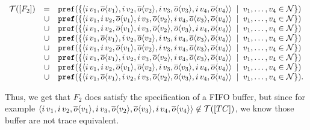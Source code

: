 \begin{align*}
	\begin{array}{rcl}
		\traces[F_2]&=&\pref{\set[v_1,\ldots{},v_4\in\names]{\seq{\inpa{i}{v_1},\outa{o}{v_1},\inpa{i}{v_2},\outa{o}{v_2},\inpa{i}{v_3},\outa{o}{v_3},\inpa{i}{v_4},\outa{o}{v_4}}}} \\
&\cup&\pref{\set[v_1,\ldots{},v_4\in\names]{\seq{\inpa{i}{v_1},\inpa{i}{v_2},\outa{o}{v_1},\inpa{i}{v_3},\outa{o}{v_2},\inpa{i}{v_4},\outa{o}{v_3},\outa{o}{v_4}}}} \\
&\cup&\pref{\set[v_1,\ldots{},v_4\in\names]{\seq{\inpa{i}{v_1},\inpa{i}{v_2},\outa{o}{v_1},\inpa{i}{v_3},\outa{o}{v_2},\outa{o}{v_3},\inpa{i}{v_4},\outa{o}{v_4}}}} \\
&\cup&\pref{\set[v_1,\ldots{},v_4\in\names]{\seq{\inpa{i}{v_1},\outa{o}{v_1},\inpa{i}{v_2},\outa{o}{v_2},\inpa{i}{v_3},\inpa{i}{v_4},\outa{o}{v_3},\outa{o}{v_4}}}} \\
&\cup&\pref{\set[v_1,\ldots{},v_4\in\names]{\seq{\inpa{i}{v_1},\inpa{i}{v_2},\outa{o}{v_1},\outa{o}{v_2},\inpa{i}{v_3},\inpa{i}{v_4},\outa{o}{v_3},\outa{o}{v_4}}}} \\
&\cup&\pref{\set[v_1,\ldots{},v_4\in\names]{\seq{\inpa{i}{v_1},\outa{o}{v_1},\inpa{i}{v_2},\inpa{i}{v_3},\outa{o}{v_2},\inpa{i}{v_4},\outa{o}{v_3},\outa{o}{v_4}}}} \\
&\cup&\pref{\set[v_1,\ldots{},v_4\in\names]{\seq{\inpa{i}{v_1},\inpa{i}{v_2},\outa{o}{v_1},\outa{o}{v_2},\inpa{i}{v_3},\outa{o}{v_3},\inpa{i}{v_4},\outa{o}{v_4}}}} \\
&\cup&\pref{\set[v_1,\ldots{},v_4\in\names]{\seq{\inpa{i}{v_1},\outa{o}{v_1},\inpa{i}{v_2},\inpa{i}{v_3},\outa{o}{v_2},\outa{o}{v_3},\inpa{i}{v_4},\outa{o}{v_4}}}}. 
	\end{array}
\end{align*}

Thus, we get that $F_2$ does satisfy the specification of a FIFO buffer, but since for example $\seq{\inpa{i}{v_1},\inpa{i}{v_2},\outa{o}{v_1},\inpa{i}{v_3},\outa{o}{v_2},\outa{o}{v_3},\inpa{i}{v_4},\outa{o}{v_4}}\nin\traces[TC]$, we know those buffer are not trace equivalent.

